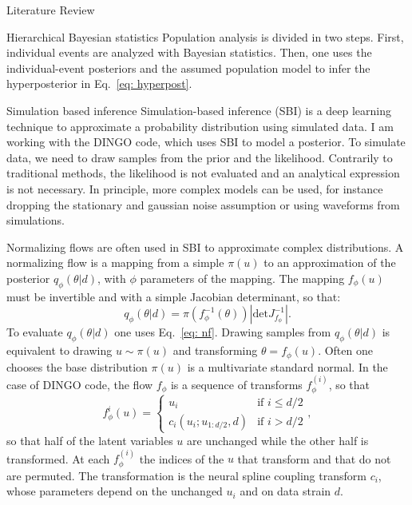 \documentclass[a4paper, 12pt, twoside, openright, titlepage]{book}
\begin{document}
\begin{chapter}{Literature Review}
\begin{section}{Hierarchical Bayesian statistics}
Population analysis is divided in two steps.
First, individual events are analyzed with Bayesian statistics. 
Then, one uses the individual-event posteriors and the assumed population model to infer the hyperposterior in Eq.~\ref{eq: hyperpost}.

\end{section}



\begin{section}{Simulation based inference}
Simulation-based inference (SBI) is a deep learning technique to approximate a probability distribution using simulated data.
I am working with the DINGO code, which uses SBI to model a posterior.
To simulate data, we need to draw samples from the prior and the likelihood.
Contrarily to traditional methods, the likelihood is not evaluated and an analytical expression is not necessary. 
In principle, more complex models can be used, for instance dropping the stationary and gaussian noise assumption or using waveforms from simulations.


Normalizing flows are often used in SBI to approximate complex distributions.
A normalizing flow is a mapping from a simple $\pi(u)$ to an approximation of the posterior $q_{\phi}(\theta|d)$, with $\phi$ parameters of the mapping. 
The mapping $f_{\phi}(u)$ must be invertible and with a simple Jacobian determinant, so that:
\begin{equation}
\label{eq: nf}
q_{\phi}(\theta|d) = \pi(f_{\phi}^{-1}(\theta))\left|\textrm{det}J_{f_{\phi}}^{-1}\right|.
\end{equation}
To evaluate $q_{\phi}(\theta|d)$ one uses Eq.~\ref{eq: nf}. Drawing samples from $q_{\phi}(\theta|d)$ is equivalent to drawing $u\sim\pi(u)$ and transforming $\theta=f_{\phi}(u)$.
Often one chooses the base distribution $\pi(u)$ is a multivariate standard normal.
In the case of DINGO code, the flow $f_{\phi}$ is a sequence of transforms $f_{\phi}^{(i)}$, so that
\begin{equation}
f_{\phi}^{i}(u) = 
\begin{cases}
u_{i} & \text{if } i\leq d/2 \\
c_{i}(u_{i}; u_{1:{d/2}},d) & \text{if } i> d/2
\end{cases},
\end{equation}
so that half of the latent variables $u$ are unchanged while the other half is transformed.
At each $f_{\phi}^{(i)}$ the indices of the $u$ that transform and that do not are permuted.
The transformation is the neural spline coupling transform $c_{i}$, whose parameters depend on the unchanged $u_{i}$ and on data strain $d$.


\end{section}
\end{chapter}
\end{document}
